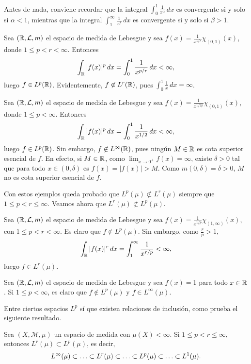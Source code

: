 \documentclass[a4paper, 11pt, oneside]{report}
\begin{document}
Antes de nada, conviene recordar que la integral $\int_0^1 \frac{1}{x^\alpha} \, dx$ es convergente si y solo si $\alpha < 1$, mientras que la integral $\int_1^\infty \frac{1}{x^\beta} \, dx$ es convergente si y solo si $\beta > 1$.

\begin{example}
  Sea $(\mathbb R,\mathcal{L},m)$ el espacio de medida de Lebesgue y sea $f(x)=\frac{1}{x^{1/r}}\chi_{(0,1)}(x)$, donde $1 \leq p < r < \infty$. Entonces
  \[\int_\mathbb R |f(x)|^p \, dx = \int_0^1\frac{1}{x^{p/r}} \, dx < \infty,\]
  luego $f \in L^p(\mathbb R)$. Evidentemente, $f \not\in L^r(\mathbb R)$, pues $\int_0^1\frac{1}{x} \, dx = \infty$.
\end{example}

\begin{example}
  Sea $(\mathbb R,\mathcal{L},m)$ el espacio de medida de Lebesgue y sea $f(x)=\frac{1}{x^{1/2p}}\chi_{(0,1)}(x)$, donde $1 \leq p < \infty$. Entonces
  \[\int_\mathbb R |f(x)|^p \, dx = \int_0^1\frac{1}{x^{1/2}} \, dx < \infty,\]
  luego $f \in L^p(\mathbb R)$. Sin embargo, $f \not\in L^\infty(\mathbb R)$, pues ningún $M \in \mathbb R$ es cota superior esencial de $f$. En efecto, si $M \in \mathbb R$, como $\lim_{x \to 0^+} f(x)=\infty$, existe $\delta > 0$ tal que para todo $x \in (0,\delta)$ es $f(x)=|f(x)| > M$. Como $m(0,\delta) = \delta > 0$, $M$ no es cota superior esencial de $f$.
\end{example}

Con estos ejemplos queda probado que $L^p(\mu) \not\subset L^r(\mu)$ siempre que $1 \leq p < r \leq \infty$. Veamos ahora que $L^r(\mu) \not\subset L^p(\mu)$.

\begin{example}
  Sea $(\mathbb R,\mathcal{L},m)$ el espacio de medida de Lebesgue y sea $f(x)=\frac{1}{x^{1/p}}\chi_{(1,\infty)}(x)$, con $1 \leq p < r < \infty$. Es claro que $f \not\in L^p(\mu)$. Sin embargo, como $\frac{r}{p}>1$,
  \[\int_\mathbb R |f(x)|^r \, dx = \int_1^\infty \frac{1}{x^{r/p}} < \infty,\]
  luego $f \in L^r(\mu)$.
\end{example}

\begin{example}
  Sea $(\mathbb R,\mathcal{L},m)$ el espacio de medida de Lebesgue y sea $f(x)=1$ para todo $x \in \mathbb R$. Si $1 \leq p< \infty$, es claro que $f\not\in L^p(\mu)$ y $f \in L^\infty(\mu)$.
\end{example}

Entre ciertos espacios $L^p$ sí que existen relaciones de inclusión, como prueba el siguiente resultado.

\begin{theorem}\label{teo:1.9.5}
  Sea $(X,\mathcal{M},\mu)$ un espacio de medida con $\mu(X)<\infty$. Si $1 \leq p <r\leq \infty$, entonces $L^r(\mu) \subset L^p(\mu)$, es decir,
  \[L^\infty(\mu) \subset \mathellipsis \subset L^r(\mu) \subset \mathellipsis \subset L^p(\mu) \subset \mathellipsis \subset L^1(\mu).\]
\end{theorem}
\end{document}
